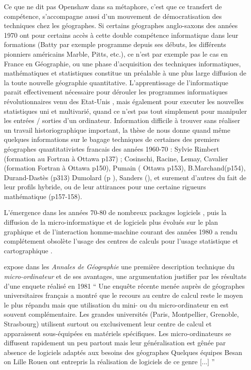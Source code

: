 Ce que ne dit pas Openshaw dans sa métaphore, c’est que ce transfert de compétence, s’accompagne aussi d’un mouvement de démocratisation des techniques chez les géographes. Si certains géographes anglo-saxons des années 1970 ont pour certains accès à cette double compétence informatique dans leur formations (Batty par exemple programme depuis ses débuts, les différents pionniers américains Marble, Pitts, etc.), ce n’est par exemple pas le cas en France en Géographie, ou une phase d’acquisition des techniques informatiques, mathématiques et statistiques constitue un préalable à une plus large diffusion de la toute nouvelle géographie quantitative. L’apprentissage de l’informatique parait effectivement nécessaire pour dérouler les programmes informatiques révolutionnaires venu des Etat-Unis \autocite[150,127]{Cuyala2014}, mais également pour executer les nouvelles statistiques uni et multivarié, quand ce n’est pas tout simplement pour manipuler les entrées / sorties d’un ordinateur. Information difficile à trouver sans réaliser un travail historiographique important, la thèse de \textcite{Cuyala2014} nous donne quand même quelques informations sur le bagage techniques de certaines des premiers géographes quantitativistes francais des années 1960-70 : Sylvie Rimbert (formation au Fortran à Ottawa p137) ;  Cosinschi, Racine, Lemay, Cavalier (formation Fortran à Ottawa p150), Pumain ( Ottawa p153), B.Marchand(p154), Durand-Dastès (p313) Dumolard (p ), Sanders (), et surement d’autres du fait de leur profils hybride, ou de leur attirances pour une certaine rigueurs mathématique (p157-158). 

L’émergence dans les années 70-80 de nombreux packages logiciels \autocite[444]{Joliveau2004}, puis la diffusion de la micro-informatique et de logiciels plus évolués sur le plan graphique et de l’interaction homme-machine courant des années 1980 a rendu complétement obsolète l’usage des centres de calculs pour l’usage statistique et cartographique \autocites{Joliveau2004, Waniez2010}. 

\textcite{Lecarpentier1983} expose dans les \textit{Annales de Géographie} une première description technique du \textit{micro-ordinateur} et de ses avantages, une argumentation justifier par les résultats d'une enquete réalisé en 1981 \enquote{ Une enquête récente menée auprès de géographes universitaires français a montré que le recours au centre de calcul reste le
moyen le plus répandu mais que utilisation du mini- ou du micro-ordinateur en est souvent complémentaire. Les grandes universités (Paris, Montpellier,  Grenoble, Strasbourg) utilisent surtout ou exclusivement leur centre de calcul et apparaissent sous-équipées en matériels spécifiques. Les micro-ordinateurs se diffusent rapidement un peu partout mais leur généralisation est gênée par absence de logiciels adaptés aux besoins des géographes Quelques équipes Besan on Lille Rouen ont entrepris la réalisation de logiciels de ce genre [...] }

